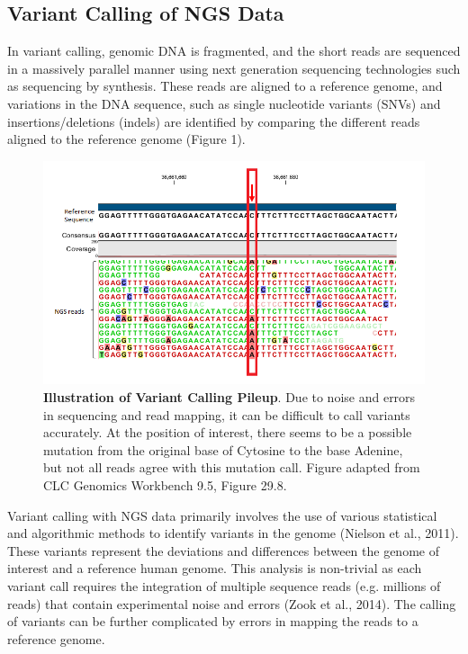 \documentclass{article}
\begin{document}
\subsection{Variant Calling of NGS Data}
In variant calling, genomic DNA is fragmented, and the short reads are sequenced in a massively parallel manner using next generation sequencing technologies such as sequencing by synthesis. These reads are aligned to a reference genome, and variations in the DNA sequence, such as single nucleotide variants (SNVs) and insertions/deletions (indels) are identified by comparing the different reads aligned to the reference genome (Figure 1).
\begin{figure}[H]
\includegraphics[width=\textwidth]{ngsreads.png}
\centering
\caption{ \textbf{Illustration of Variant Calling Pileup}. Due to noise and errors in sequencing and read mapping, it can be difficult to call variants accurately. At the position of interest, there seems to be a possible mutation from the original base of Cytosine to the base Adenine, but not all reads agree with this mutation call. Figure adapted from CLC Genomics Workbench 9.5, Figure 29.8.}
\end{figure}
Variant calling with NGS data primarily involves the use of various statistical and algorithmic methods to identify variants in the genome (Nielson et al., 2011). These variants represent the deviations and differences between the genome of interest and a reference human genome. This analysis is non-trivial as each variant call requires the integration of multiple sequence reads (e.g. millions of reads) that contain experimental noise and errors (Zook et al., 2014). The calling of variants can be further complicated by errors in mapping the reads to a reference genome.\\\\
\end{document}
